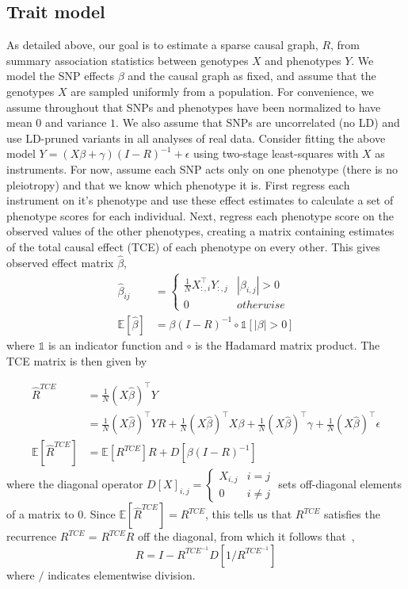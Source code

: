 \documentclass{article}
\begin{document}
\subsection{Trait model}
As detailed above, our goal is to estimate a sparse causal graph, $R$, from
summary association statistics between genotypes $X$ and phenotypes $Y$. We model
the SNP effects $\beta$ and the causal graph as fixed, and assume that the genotypes
$X$ are sampled uniformly from a population. For convenience, we assume throughout that SNPs
 and phenotypes have been normalized
 to have mean $0$ and variance $1$. We also assume that SNPs are uncorrelated (no LD)
and use LD-pruned variants in all analyses of real data.
Consider fitting the above model $Y = (X\beta + \gamma)(I-R)^{-1} + \epsilon$
using two-stage least-squares with $X$ as instruments. For now,
 assume each SNP acts only on one phenotype
(there is no pleiotropy) and that we know which phenotype it is.
First regress each instrument on it's phenotype and use these effect
 estimates to calculate a set of phenotype scores for each individual.
Next, regress each phenotype score on the observed values of the other phenotypes,
 creating a matrix containing estimates of the total causal effect (TCE) of
 each phenotype on every other. This gives observed effect matrix $\hat{\beta}$,
\begin{align*}
\hat{\beta}_{ij} &= \left\{
 \begin{array}{ll}
  \frac{1}{N} X_{:, i}^{\top}Y_{:,j} & |\beta_{i,j}| > 0 \\
  0 & otherwise
 \end{array} \right. \\
 \mathbb{E}[\hat{\beta} ] &= \beta (I-R)^{-1} \circ \mathds{1}[|\beta| > 0]
\end{align*}
where $\mathds{1}$ is an indicator function and $\circ$ is the Hadamard matrix
product. The TCE matrix is then given by

\begin{align*}
\hat{R}^{TCE} &= \frac{1}{N} (X\hat{\beta})^{\top} Y \\
  &= \frac{1}{N} (X\hat{\beta})^{\top} Y R + \frac{1}{N}(X\hat{\beta})^{\top} X \beta +
     \frac{1}{N}(X\hat{\beta})^{\top} \gamma + \frac{1}{N}(X\hat{\beta})^{\top} \epsilon \\
\mathbb{E}[\hat{R}^{TCE}]  &= \mathbb{E}[R^{TCE}] R + D[\beta (I-R)^{-1}]
\end{align*}
where the diagonal operator $D[X]_{i,j} = \left\{ \begin{array}{ll}
  X_{i,j} & i=j \\ 0 & i \neq j \end{array} \right.$ sets off-diagonal elements
  of a matrix to 0.
  Since $\mathbb{E}[\hat{R}^{TCE}] =R^{TCE}$,
this tells us that $R^{TCE}$ satisfies the recurrence
  $R^{TCE}$ = $R^{TCE} R$ off the diagonal, from
  which it follows that~\cite{Pachter},
\begin{equation}\label{r_cde}
R = I - R^{TCE^{-1}} D[1 / R^{TCE^{-1}}]
\end{equation}
where $/$ indicates elementwise division.
\end{document}

